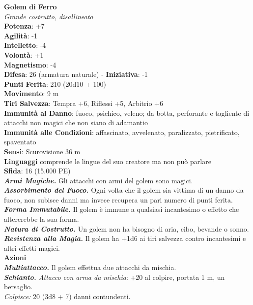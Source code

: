 \begin{multicols}{2}
\medskip\textbf{Golem di Ferro}\\
\emph{Grande costrutto, disallineato}\\
\textbf{Potenza}: +7\\
\textbf{Agilità}: -1\\
\textbf{Intelletto}: -4\\
\textbf{Volontà}: +1\\
\textbf{Magnetismo}: -4\\
\textbf{Difesa}: 26 (armatura naturale) - \textbf{Iniziativa}: -1\\
\textbf{Punti Ferita}: 210 (20d10 + 100)\\
\textbf{Movimento}: 9 m\\
\textbf{Tiri Salvezza}: Tempra +6, Riflessi +5, Arbitrio +6\\
\textbf{Immunità al Danno}: fuoco, psichico, veleno; da botta, perforante e tagliente di attacchi non magici che non siano di adamantio\\
\textbf{Immunità alle Condizioni}: affascinato, avvelenato, paralizzato, pietrificato, spaventato\\
\textbf{Sensi}: Scurovisione 36 m\\
\textbf{Linguaggi} comprende le lingue del suo creatore ma non può parlare\\
\textbf{Sfida}: 16 (15.000 PE)\smallskip\\
\emph{\textbf{Armi Magiche.}} Gli attacchi con armi del golem sono magici.\\
\emph{\textbf{Assorbimento del Fuoco.}} Ogni volta che il golem sia vittima di un danno da fuoco, non subisce danni ma invece recupera un pari numero di punti ferita.\\
\emph{\textbf{Forma Immutabile.}} Il golem è immune a qualsiasi incantesimo o effetto che altererebbe la sua forma.\\
\emph{\textbf{Natura di Costrutto.}} Un golem non ha bisogno di aria, cibo, bevande o sonno.\\
\emph{\textbf{Resistenza alla Magia.}} Il golem ha +1d6 ai tiri salvezza contro incantesimi e altri effetti magici.\\
\smallskip\textbf{Azioni}\\
\emph{\textbf{Multiattacco.}} Il golem effettua due attacchi da mischia. \\
\emph{\textbf{Schianto.} Attacco con arma da mischia}: +20 al colpire, portata 1 m, un bersaglio.\\
\emph{Colpisce:} 20 (3d8 + 7) danni contundenti.\\

\end{multicols}
